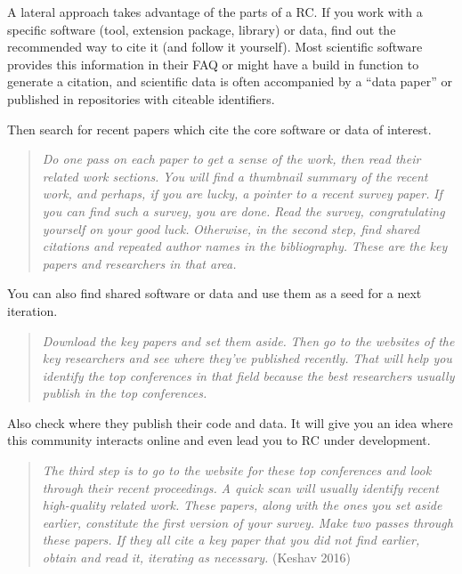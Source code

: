 \documentclass[fleqn,10pt]{wlpeerj} %
\begin{document}
A lateral approach takes advantage of the parts of a RC. If you work
with a specific software (tool, extension package, library) or data,
find out the recommended way to cite it (and follow it yourself). Most
scientific software provides this information in their FAQ or might have
a build in function to generate a citation, and scientific data is often
accompanied by a ``data paper'' or published in repositories with
citeable identifiers.

Then search for recent papers which cite the core software or data of
interest.

\begin{quote}
\emph{Do one pass on each paper to get a sense of the work, then read
their related work sections.} \emph{You will find a thumbnail summary of
the recent work, and perhaps, if you are lucky, a pointer to a recent
survey paper.} \emph{If you can find such a survey, you are done.}
\emph{Read the survey, congratulating yourself on your good luck.}
\emph{Otherwise, in the second step, find shared citations and repeated
author names in the bibliography.} \emph{These are the key papers and
researchers in that area.}
\end{quote}

You can also find shared software or data and use them as a seed for a
next iteration.

\begin{quote}
\emph{Download the key papers and set them aside.} \emph{Then go to the
websites of the key researchers and see where they've published
recently.} \emph{That will help you identify the top conferences in that
field because the best researchers usually publish in the top
conferences.}
\end{quote}

Also check where they publish their code and data. It will give you an
idea where this community interacts online and even lead you to RC under
development.

\begin{quote}
\emph{The third step is to go to the website for these top conferences
and look through their recent proceedings.} \emph{A quick scan will
usually identify recent high-quality related work.} \emph{These papers,
along with the ones you set aside earlier, constitute the first version
of your survey.} \emph{Make two passes through these papers.} \emph{If
they all cite a key paper that you did not find earlier, obtain and read
it, iterating as necessary.} (Keshav 2016)
\end{quote}
\end{document}
